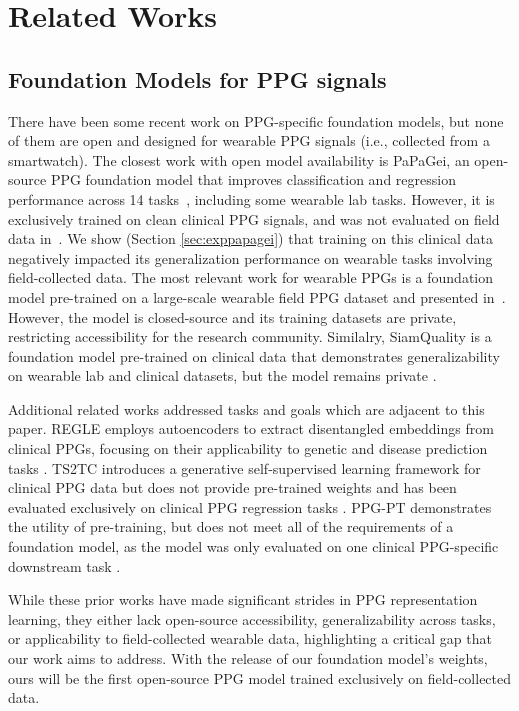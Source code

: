 \section{Related Works}
\subsection{Foundation Models for PPG signals}

There have been some recent work on PPG-specific foundation models, but none of them are open and designed for wearable PPG signals (i.e., collected from a smartwatch). The closest work with open model availability is PaPaGei, an open-source PPG foundation model that improves classification and regression performance across 14 tasks~\cite{pillai2024papagei}, including some  wearable lab tasks. However, it is exclusively trained on clean clinical PPG signals, and was not evaluated on field data in~\cite{pillai2024papagei}. We show (Section \ref{sec:exppapagei}) that training on this clinical data negatively impacted its generalization performance on wearable tasks involving field-collected data. The most relevant work for wearable PPGs is a foundation model pre-trained on a large-scale wearable field PPG dataset and presented in~\cite{abbaspourazad2023large}. However, the model is closed-source and its training datasets are private, restricting accessibility for the research community. Similalry, SiamQuality is a foundation model pre-trained on clinical data that demonstrates  generalizability on wearable lab and clinical datasets, but the model remains private \cite{ding2024siamquality}. 

Additional related works addressed tasks and goals which are adjacent to this paper. 
REGLE employs autoencoders to extract disentangled embeddings from clinical PPGs, focusing on their applicability to genetic and disease prediction tasks \cite{yun2024unsupervised}. TS2TC introduces a generative self-supervised learning framework for clinical PPG data but does not provide pre-trained weights and has been evaluated exclusively on clinical PPG regression tasks \cite{zhang2024general}. PPG-PT demonstrates the utility of pre-training, but does not meet all of the requirements of a foundation model, %
as the model was only evaluated on one clinical PPG-specific downstream task \cite{davies2024interpretable}.


While these prior works have made significant strides in PPG representation learning, they either lack open-source accessibility, generalizability across tasks, or applicability to field-collected wearable data, highlighting a critical gap that our work aims to address. With the release of our foundation model's weights, ours will be the first open-source PPG model trained exclusively on field-collected data.

